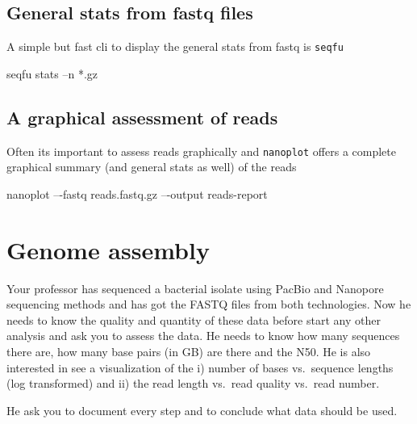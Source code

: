 \documentclass[
  letterpaper,
  DIV=11,
  numbers=noendperiod]{scrreprt}
\newenvironment{Shaded}{\begin{snugshade}}{\end{snugshade}}
\newcommand{\ExtensionTok}[1]{\textcolor[rgb]{0.00,0.46,0.62}{#1}}
\newcommand{\NormalTok}[1]{\textcolor[rgb]{0.00,0.46,0.62}{#1}}
\newcommand{\PreprocessorTok}[1]{\textcolor[rgb]{0.68,0.00,0.00}{#1}}
\begin{document}
\hypertarget{general-stats-from-fastq-files}{%
\section*{General stats from fastq
files}\label{general-stats-from-fastq-files}}

A simple but fast cli to display the general stats from fastq is
\texttt{seqfu}

\begin{Shaded}
\begin{Highlighting}[]
\ExtensionTok{seqfu}\NormalTok{ stats –n }\PreprocessorTok{*}\NormalTok{.gz}
\end{Highlighting}
\end{Shaded}

\hypertarget{a-graphical-assessment-of-reads}{%
\section*{A graphical assessment of
reads}\label{a-graphical-assessment-of-reads}}

Often its important to assess reads graphically and \texttt{nanoplot}
offers a complete graphical summary (and general stats as well) of the
reads

\begin{Shaded}
\begin{Highlighting}[]
\ExtensionTok{nanoplot}\NormalTok{ –{-}fastq reads.fastq.gz –{-}output reads{-}report}
\end{Highlighting}
\end{Shaded}

\hypertarget{genome-assembly}{%
\chapter{Genome assembly}\label{genome-assembly}}

\begin{tcolorbox}[standard jigsaw,rightrule=.15mm, bottomtitle=1mm, toprule=.15mm, titlerule=0mm, toptitle=1mm, opacitybacktitle=0.6, arc=.35mm, colframe=quarto-callout-warning-color-frame, colbacktitle=quarto-callout-warning-color!10!white, coltitle=black, title=\textcolor{quarto-callout-warning-color}{\faExclamationTriangle}\hspace{0.5em}{Challenge}, bottomrule=.15mm, colback=white, leftrule=.75mm, left=2mm, opacityback=0]
Your professor has sequenced a bacterial isolate using PacBio and
Nanopore sequencing methods and has got the FASTQ files from both
technologies. Now he needs to know the quality and quantity of these
data before start any other analysis and ask you to assess the data. He
needs to know how many sequences there are, how many base pairs (in GB)
are there and the N50. He is also interested in see a visualization of
the i) number of bases vs.~sequence lengths (log transformed) and ii)
the read length vs.~read quality vs.~read number.

He ask you to document every step and to conclude what data should be
used.
\end{tcolorbox}
\end{document}
